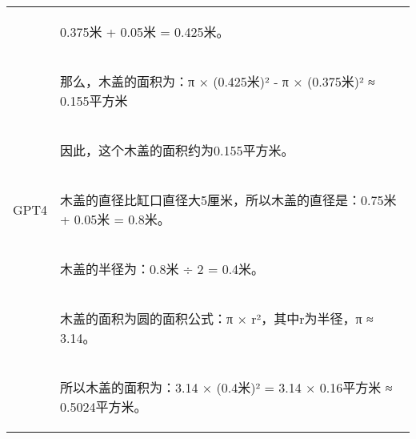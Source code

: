 \documentclass{article}
\begin{document}
\begin{table}[h!]
\begin{tabular}{ c|l }
             & \begin{CJK*}{UTF8}{gbsn} 0.375米 + 0.05米 = 0.425米。\end{CJK*}\\
             & \begin{CJK*}{UTF8}{gbsn} 那么，木盖的面积为：π × (0.425米)² - π × (0.375米)² ≈ 0.155平方米\end{CJK*}\\ 
             & \begin{CJK*}{UTF8}{gbsn} 因此，这个木盖的面积约为0.155平方米。\end{CJK*}\\ 
 \hline
 GPT4 & \begin{CJK*}{UTF8}{gbsn} 木盖的直径比缸口直径大5厘米，所以木盖的直径是：0.75米 + 0.05米 = 0.8米。\end{CJK*}\\
             & \begin{CJK*}{UTF8}{gbsn} 木盖的半径为：0.8米 ÷ 2 = 0.4米。\end{CJK*}\\
             & \begin{CJK*}{UTF8}{gbsn} 木盖的面积为圆的面积公式：π × r²，其中r为半径，π ≈ 3.14。\end{CJK*}\\
             & \begin{CJK*}{UTF8}{gbsn} 所以木盖的面积为：3.14 × (0.4米)² = 3.14 × 0.16平方米 ≈ 0.5024平方米。 \end{CJK*}\\ 
 \hline
\end{tabular}
\end{table}
\end{document}

